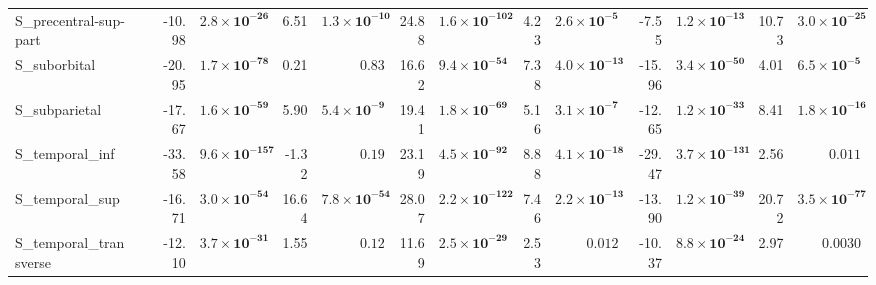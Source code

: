{\begin{longtable}{llrrrrrrrrrrrr}
S\_precentral-sup-part &  & -10.98 & $\mathbf{2.8{\times}10^{-26}}$ & 6.51 & $\mathbf{1.3{\times}10^{-10}}$ & 24.88 & $\mathbf{1.6{\times}10^{-102}}$ & 4.23 & $\mathbf{2.6{\times}10^{-5}}$ & -7.55 & $\mathbf{1.2{\times}10^{-13}}$ & 10.73 & $\mathbf{3.0{\times}10^{-25}}$ \\
S\_suborbital &  & -20.95 & $\mathbf{1.7{\times}10^{-78}}$ & 0.21 & $0.83$ & 16.62 & $\mathbf{9.4{\times}10^{-54}}$ & 7.38 & $\mathbf{4.0{\times}10^{-13}}$ & -15.96 & $\mathbf{3.4{\times}10^{-50}}$ & 4.01 & $\mathbf{6.5{\times}10^{-5}}$ \\
S\_subparietal &  & -17.67 & $\mathbf{1.6{\times}10^{-59}}$ & 5.90 & $\mathbf{5.4{\times}10^{-9}}$ & 19.41 & $\mathbf{1.8{\times}10^{-69}}$ & 5.16 & $\mathbf{3.1{\times}10^{-7}}$ & -12.65 & $\mathbf{1.2{\times}10^{-33}}$ & 8.41 & $\mathbf{1.8{\times}10^{-16}}$ \\
S\_temporal\_inf &  & -33.58 & $\mathbf{9.6{\times}10^{-157}}$ & -1.32 & $0.19$ & 23.19 & $\mathbf{4.5{\times}10^{-92}}$ & 8.88 & $\mathbf{4.1{\times}10^{-18}}$ & -29.47 & $\mathbf{3.7{\times}10^{-131}}$ & 2.56 & $0.011$ \\
S\_temporal\_sup &  & -16.71 & $\mathbf{3.0{\times}10^{-54}}$ & 16.64 & $\mathbf{7.8{\times}10^{-54}}$ & 28.07 & $\mathbf{2.2{\times}10^{-122}}$ & 7.46 & $\mathbf{2.2{\times}10^{-13}}$ & -13.90 & $\mathbf{1.2{\times}10^{-39}}$ & 20.72 & $\mathbf{3.5{\times}10^{-77}}$ \\
S\_temporal\_transverse &  & -12.10 & $\mathbf{3.7{\times}10^{-31}}$ & 1.55 & $0.12$ & 11.69 & $\mathbf{2.5{\times}10^{-29}}$ & 2.53 & $0.012$ & -10.37 & $\mathbf{8.8{\times}10^{-24}}$ & 2.97 & $0.0030$ \\
\end{longtable}}
